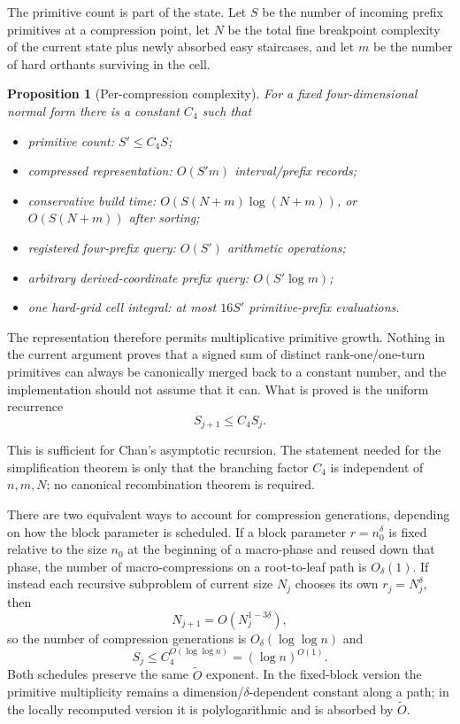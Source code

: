 \documentclass[12pt,a4paper]{article}
\newtheorem{proposition}[theorem]{Proposition}
\theoremstyle{definition}
\newcommand{\1}{\mathbf 1}
\begin{document}
The primitive count is part of the state.  Let $S$ be the number of incoming prefix primitives at a compression point, let $N$ be the total fine breakpoint complexity of the current state plus newly absorbed easy staircases, and let $m$ be the number of hard orthants surviving in the cell.

\begin{proposition}[Per-compression complexity]                   \label{prop:complexity}
For a fixed four-dimensional normal form there is a constant $C_4$ such that
\begin{itemize}[leftmargin=2em]
\item primitive count: $S'\le C_4S$;
\item compressed representation: $O(S'm)$ interval/prefix records;
\item conservative build time: $O(S(N+m)\log(N+m))$, or $O(S(N+m))$ after sorting;
\item registered four-prefix query: $O(S')$ arithmetic operations;
\item arbitrary derived-coordinate prefix query: $O(S'\log m)$;
\item one hard-grid cell integral: at most $16S'$ primitive-prefix evaluations.
\end{itemize}
\end{proposition}

The representation therefore permits multiplicative primitive growth.  Nothing in the current argument proves that a signed sum of distinct rank-one/one-turn primitives can always be canonically merged back to a constant number, and the implementation should not assume that it can.  What is proved is the uniform recurrence
\[
S_{j+1}\le C_4S_j.
\]

This is sufficient for Chan's asymptotic recursion.  The statement needed for the simplification theorem is only that the branching factor $C_4$ is independent of $n,m,N$; no canonical recombination theorem is required.

There are two equivalent ways to account for compression generations, depending on how the block parameter is scheduled.  If a block parameter $r=n_0^{\delta}$ is fixed relative to the size $n_0$ at the beginning of a macro-phase and reused down that phase, the number of macro-compressions on a root-to-leaf path is $O_{\delta}(1)$.  If instead each recursive subproblem of current size $N_j$ chooses its own $r_j=N_j^{\delta}$, then
\[
N_{j+1}=O(N_j^{1-3\delta}),
\]
so the number of compression generations is $O_{\delta}(\log\log n)$ and
\[
S_j\le C_4^{O(\log\log n)}=(\log n)^{O(1)}.
\]
Both schedules preserve the same $\widetilde O$ exponent.  In the fixed-block version the primitive multiplicity remains a dimension/$\delta$-dependent constant along a path; in the locally recomputed version it is polylogarithmic and is absorbed by $\widetilde O$.
\end{document}
